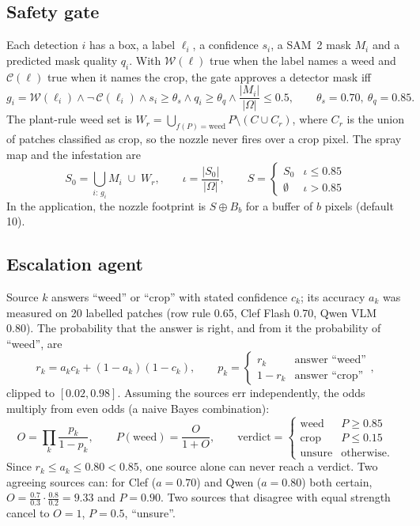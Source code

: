 \subsection{Safety gate}\label{sec:math-gate}
Each detection $i$ has a box, a label $\ell_i$, a confidence $s_i$, a SAM~2 mask $M_i$ and a predicted
mask quality $q_i$. With $\mathcal W(\ell)$ true when the label names a weed and $\mathcal C(\ell)$ true
when it names the crop, the gate approves a detector mask iff
\begin{equation}
  g_i = \mathcal W(\ell_i)\wedge\neg\,\mathcal C(\ell_i)\wedge s_i\ge\theta_s\wedge q_i\ge\theta_q\wedge
        \frac{|M_i|}{|\Omega|}\le 0.5,\qquad \theta_s=0.70,\ \theta_q=0.85 .
\end{equation}
The plant-rule weed set is $W_r=\bigcup_{f(P)=\text{weed}}P\setminus(C\cup C_r)$, where $C_r$ is the
union of patches classified as crop, so the nozzle never fires over a crop pixel. The spray map and
the infestation are
\begin{equation}
  S_0=\bigcup_{i:\,g_i}M_i\;\cup\;W_r,\qquad \iota=\frac{|S_0|}{|\Omega|},\qquad
  S=\begin{cases}S_0 & \iota\le 0.85\\ \emptyset & \iota>0.85\end{cases}
\end{equation}
In the application, the nozzle footprint is $S\oplus B_b$ for a buffer of $b$ pixels (default 10).

\subsection{Escalation agent}\label{sec:math-agent}
Source $k$ answers ``weed'' or ``crop'' with stated confidence $c_k$; its accuracy $a_k$ was measured
on 20 labelled patches (row rule 0.65, Clef Flash 0.70, Qwen VLM 0.80). The probability that the
answer is right, and from it the probability of ``weed'', are
\begin{equation}
  r_k = a_k c_k + (1-a_k)(1-c_k),\qquad
  p_k=\begin{cases} r_k & \text{answer ``weed''}\\ 1-r_k & \text{answer ``crop''}\end{cases},
\end{equation}
clipped to $[0.02,0.98]$. Assuming the sources err independently, the odds multiply from even odds
(a naive Bayes combination):
\begin{equation}
  O=\prod_k\frac{p_k}{1-p_k},\qquad P(\text{weed})=\frac{O}{1+O},\qquad
  \text{verdict}=\begin{cases}\text{weed} & P\ge 0.85\\ \text{crop} & P\le 0.15\\ \text{unsure} & \text{otherwise.}\end{cases}
\end{equation}
Since $r_k\le a_k\le 0.80<0.85$, one source alone can never reach a verdict. Two agreeing sources can:
for Clef ($a=0.70$) and Qwen ($a=0.80$) both certain, $O=\frac{0.7}{0.3}\cdot\frac{0.8}{0.2}=9.33$ and
$P=0.90$. Two sources that disagree with equal strength cancel to $O=1$, $P=0.5$, ``unsure''.

